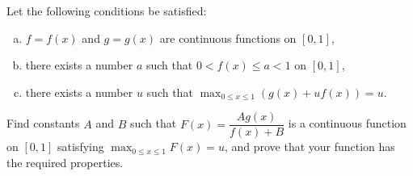 Let the following conditions be satisfied:

\begin{enumerate}[(a)]

\item $f = f(x)$ and $g = g(x)$ are continuous functions on $[0, 1]$,
\item there exists a number $a$ such that $0 < f(x) \le a < 1$ on $[0, 1]$,
\item there exists a number $u$ such that $\displaystyle{\max_{0 \le x \le 1}
      (g(x) + u f(x)) = u}$.

\end{enumerate}

Find constants $A$ and $B$ such that $F(x) = \dfrac{Ag(x)}{f(x) + B}$ is a
continuous function on $[0, 1]$ satisfying $\displaystyle{\max_{0 \le x \le 1}
F(x) = u}$, and prove that your function has the required properties.
